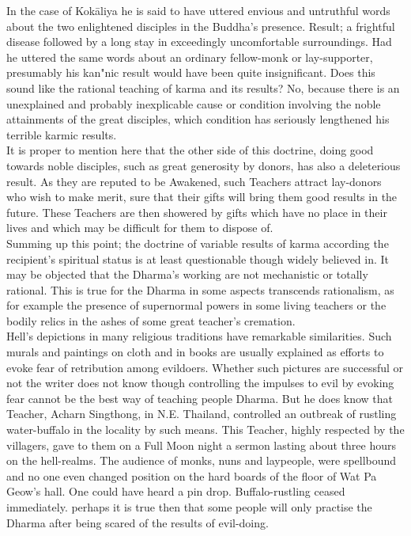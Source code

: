 In the case of Kok\=aliya he is said to have uttered envious and untruthful words about the two enlightened disciples in the Buddha's presence. Result; a frightful disease followed by a long stay in exceedingly uncomfortable surroundings. Had he uttered the same words about an ordinary fellow-monk or lay-supporter, presumably his kan"nic result would have been quite insignificant. Does this sound like the rational teaching of karma and its results? No, because there is an unexplained and probably inexplicable cause or condition involving the noble attainments of the great disciples, which condition has seriously lengthened his terrible karmic results.\\

It is proper to mention here that the other side of this doctrine, doing good towards noble disciples, such as great generosity by donors, has also a deleterious result. As they are reputed to be Awakened, such Teachers attract lay-donors who wish to make merit, sure that their gifts will bring them good results in the future. These Teachers are then showered by gifts which have no place in their lives and which may be difficult for them to dispose of.\\

Summing up this point; the doctrine of variable results of karma according the recipient's spiritual status is at least questionable though widely believed in. It may be objected that the Dharma's working are not mechanistic or totally rational. This is true for the Dharma in some aspects transcends rationalism, as for example the presence of supernormal powers in some living teachers or the bodily relics in the ashes of some great teacher's cremation.\\

Hell's depictions in many religious traditions have remarkable similarities. Such murals and paintings on cloth and in books are usually explained as efforts to evoke fear of retribution among evildoers. Whether such pictures are successful or not the writer does not know though controlling the impulses to evil by evoking fear cannot be the best way of teaching people Dharma. But he does know that Teacher, Acharn Singthong, in N.E. Thailand, controlled an outbreak of rustling water-buffalo in the locality by such means. This Teacher, highly respected by the villagers, gave to them on a Full Moon night a sermon lasting about three hours on the hell-realms. The audience of monks, nuns and laypeople, were spellbound and no one even changed position on the hard boards of the floor of Wat Pa Geow's hall. One could have heard a pin drop. Buffalo-rustling ceased immediately. perhaps it is true then that some people will only practise the Dharma after being scared of the results of evil-doing.\\

